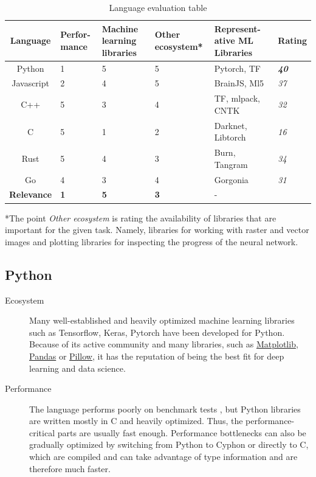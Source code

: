 \documentclass[12pt, a4paper, titlepage]{report}
\begin{document}
\begin{table}
   \begin{tabular} {|c||p{1.5cm}|p{2.0cm}|p{1.5cm}|p{2.5cm}||p{2.2cm}|}
      \hline
      \textbf{Language}    & \textbf{Perfor-mance} & \textbf{Machine learning libraries} & \textbf{Other ecosystem*} & \textbf{Represent-ative ML Libraries} & \textbf{Rating} \\
      \hline
      Python      & 1 & 5 & 5 & Pytorch, TF        & \textbf{\emph{40}} \\ \hline
      Javascript  & 2 & 4 & 5 & BrainJS, Ml5       & \emph{37} \\ \hline
      C++         & 5 & 3 & 4 & TF, mlpack, CNTK   & \emph{32} \\ \hline
      C           & 5 & 1 & 2 & Darknet, Libtorch  & \emph{16} \\ \hline
      Rust        & 5 & 4 & 3 & Burn, Tangram      & \emph{34} \\ \hline
      Go          & 4 & 3 & 4 & Gorgonia           & \emph{31} \\
      \hline\hline
      \textbf{Relevance} & \textbf{1} & \textbf{5} & \textbf{3} & - & \\
      \hline
   \end{tabular}
   \caption{Language evaluation table}
   \label{table:language_evaluation}
\end{table}

\vspace{0.5cm}
*The point \emph{Other ecosystem} is rating the availability of libraries that are important for the given task. Namely, libraries for working with raster and vector images and plotting libraries for inspecting the progress of the neural network.

{
   \center
   \subsection*{Python}
}
\begin{description}
   \item[Ecosystem] Many well-established and heavily optimized machine learning libraries such as Tensorflow, Keras, Pytorch have been developed for Python. Because of its active community and many libraries, such as \href{}{Matplotlib}, \href{}{Pandas} or \href{}{Pillow}, it has the reputation of being the best fit for deep learning and data science.
   \item[Performance] The language performs poorly on benchmark tests \cite{goodmanwen_programming-language-benchmarks-visualization_2023}, but Python libraries are written mostly in C and heavily optimized. Thus, the performance-critical parts are usually fast enough. Performance bottlenecks can also be gradually optimized by switching from Python to Cyphon or directly to C, which are compiled and can take advantage of type information and are therefore much faster.
\end{description}
\end{document}
